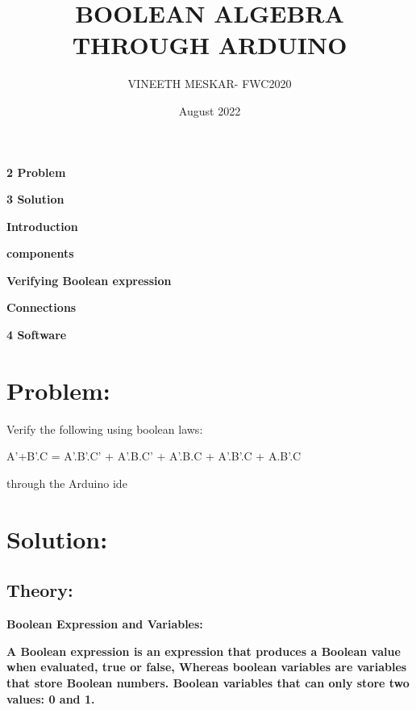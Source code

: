 \documentclass[a4paper,12pt,twocolumn]{article}
\title{BOOLEAN ALGEBRA THROUGH ARDUINO}
\author{VINEETH MESKAR- FWC2020}
\date{August 2022}
\begin{document}
\maketitle


\textbf{ 2 Problem}

\textbf{ 3 Solution}

\textbf{  Introduction}

\textbf{  components}

\textbf{  Verifying Boolean expression}

\textbf{  Connections}

\textbf{4 Software}

\section{Problem:}
Verify the following using boolean laws:

A'+B'.C = A'.B'.C' + A'.B.C' + A'.B.C + A'.B'.C + A.B'.C

through the Arduino ide
\maketitle\section{Solution:}
\subsection{Theory:}
\textbf{Boolean Expression and Variables:}

\textbf{A Boolean expression is an expression that produces a Boolean value when evaluated, true or false, Whereas boolean variables are variables that store Boolean numbers. Boolean variables that can only store two values: 0 and 1.}
\end{document}
